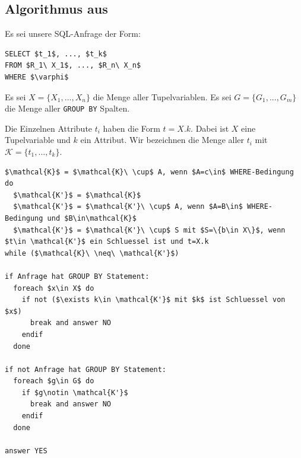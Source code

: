 \subsection{Algorithmus aus \cite{sql1folien}}

Es sei unsere SQL-Anfrage der Form:

\begin{lstlisting}[mathescape]
SELECT $t_1$, ..., $t_k$
FROM $R_1\ X_1$, ..., $R_n\ X_n$
WHERE $\varphi$
\end{lstlisting}

Es sei $X=\{X_1, ..., X_n\}$ die Menge aller Tupelvariablen. Es sei $G=\{G_1, ..., G_m\}$ die Menge aller \verb|GROUP BY| Spalten.

Die Einzelnen Attribute $t_i$ haben die Form $t = X.k$. Dabei ist $X$ eine Tupelvariable und $k$ ein Attribut. Wir bezeichnen die Menge aller $t_i$ mit $\mathcal{K}=\{t_1,...,t_k\}$.

\begin{lstlisting}[mathescape]
$\mathcal{K}$ = $\mathcal{K}\ \cup$ A, wenn $A=c\in$ WHERE-Bedingung
do 
  $\mathcal{K'}$ = $\mathcal{K}$
  $\mathcal{K'}$ = $\mathcal{K'}\ \cup$ A, wenn $A=B\in$ WHERE-Bedingung und $B\in\mathcal{K}$
  $\mathcal{K'}$ = $\mathcal{K'}\ \cup$ S mit $S=\{b\in X\}$, wenn $t\in \mathcal{K'}$ ein Schluessel ist und t=X.k
while ($\mathcal{K}\ \neq\ \mathcal{K'}$)

if Anfrage hat GROUP BY Statement:
  foreach $x\in X$ do
    if not ($\exists k\in \mathcal{K'}$ mit $k$ ist Schluessel von $x$)
      break and answer NO
    endif
  done

if not Anfrage hat GROUP BY Statement:
  foreach $g\in G$ do
    if $g\notin \mathcal{K'}$
      break and answer NO
    endif
  done

answer YES
\end{lstlisting}

